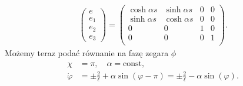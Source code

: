 \begin{align}\label{EHiper}
\begin{pmatrix}
e\\
e_1\\
e_2\\
e_3
\end{pmatrix}
=
\begin{pmatrix}
\cosh \alpha s & \sinh \alpha s & 0 &   0 \\
\sinh \alpha s & \cosh \alpha s & 0 &   0 \\
0 & 0 & 1 &   0 \\
0 & 0 & 0 &   1 \\
\end{pmatrix}.
\end{align}
Możemy teraz podać równanie na fazę zegara $\phi$ 
\begin{align*}
\chi &= \pi, \quad \alpha = \text{const,} \\
\dot{\varphi} &= \pm \frac{2}{\ell} + \alpha \sin ( \varphi - \pi )
 = \pm \frac{2}{\ell} -  \alpha \sin ( \varphi ).
\end{align*}

